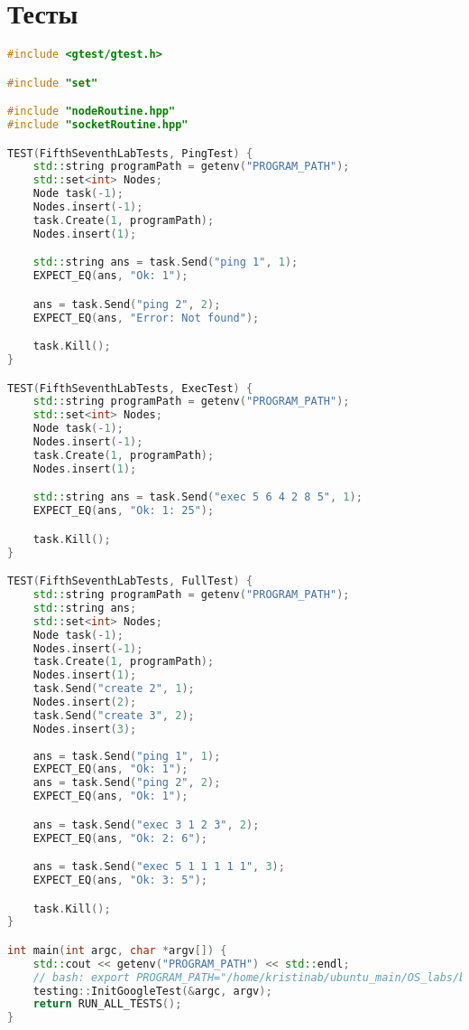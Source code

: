 \documentclass[a4paper, 12pt]{article}
\begin{document}
\section{Тесты}
\begin{lstlisting}[language=C++]
#include <gtest/gtest.h>

#include "set"

#include "nodeRoutine.hpp"
#include "socketRoutine.hpp"

TEST(FifthSeventhLabTests, PingTest) {
    std::string programPath = getenv("PROGRAM_PATH");
    std::set<int> Nodes;
    Node task(-1);
    Nodes.insert(-1);
    task.Create(1, programPath);
    Nodes.insert(1);

    std::string ans = task.Send("ping 1", 1);
    EXPECT_EQ(ans, "Ok: 1");

    ans = task.Send("ping 2", 2);
    EXPECT_EQ(ans, "Error: Not found");

    task.Kill();
}

TEST(FifthSeventhLabTests, ExecTest) {
    std::string programPath = getenv("PROGRAM_PATH");
    std::set<int> Nodes;
    Node task(-1);
    Nodes.insert(-1);
    task.Create(1, programPath);
    Nodes.insert(1);

    std::string ans = task.Send("exec 5 6 4 2 8 5", 1);
    EXPECT_EQ(ans, "Ok: 1: 25");

    task.Kill();
}

TEST(FifthSeventhLabTests, FullTest) {
    std::string programPath = getenv("PROGRAM_PATH");
    std::string ans;
    std::set<int> Nodes;
    Node task(-1);
    Nodes.insert(-1);
    task.Create(1, programPath);
    Nodes.insert(1);
    task.Send("create 2", 1);
    Nodes.insert(2);
    task.Send("create 3", 2);
    Nodes.insert(3);
    
    ans = task.Send("ping 1", 1);
    EXPECT_EQ(ans, "Ok: 1");
    ans = task.Send("ping 2", 2);
    EXPECT_EQ(ans, "Ok: 1");

    ans = task.Send("exec 3 1 2 3", 2);
    EXPECT_EQ(ans, "Ok: 2: 6");

    ans = task.Send("exec 5 1 1 1 1 1", 3);
    EXPECT_EQ(ans, "Ok: 3: 5");

    task.Kill();
}

int main(int argc, char *argv[]) {
    std::cout << getenv("PROGRAM_PATH") << std::endl;
    // bash: export PROGRAM_PATH="/home/kristinab/ubuntu_main/OS_labs/build/lab5-7/server"
    testing::InitGoogleTest(&argc, argv);
    return RUN_ALL_TESTS();
}
\end{lstlisting}
\end{document}
